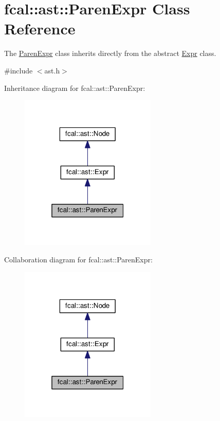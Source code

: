 \hypertarget{classfcal_1_1ast_1_1ParenExpr}{}\section{fcal\+:\+:ast\+:\+:Paren\+Expr Class Reference}
\label{classfcal_1_1ast_1_1ParenExpr}


The \hyperlink{classfcal_1_1ast_1_1ParenExpr}{Paren\+Expr} class inherits directly from the abstract \hyperlink{classfcal_1_1ast_1_1Expr}{Expr} class.  




{\ttfamily \#include $<$ast.\+h$>$}



Inheritance diagram for fcal\+:\+:ast\+:\+:Paren\+Expr\+:
\nopagebreak
\begin{figure}[H]
\begin{center}
\leavevmode
\includegraphics[width=184pt]{classfcal_1_1ast_1_1ParenExpr__inherit__graph}
\end{center}
\end{figure}


Collaboration diagram for fcal\+:\+:ast\+:\+:Paren\+Expr\+:
\nopagebreak
\begin{figure}[H]
\begin{center}
\leavevmode
\includegraphics[width=184pt]{classfcal_1_1ast_1_1ParenExpr__coll__graph}
\end{center}
\end{figure}
